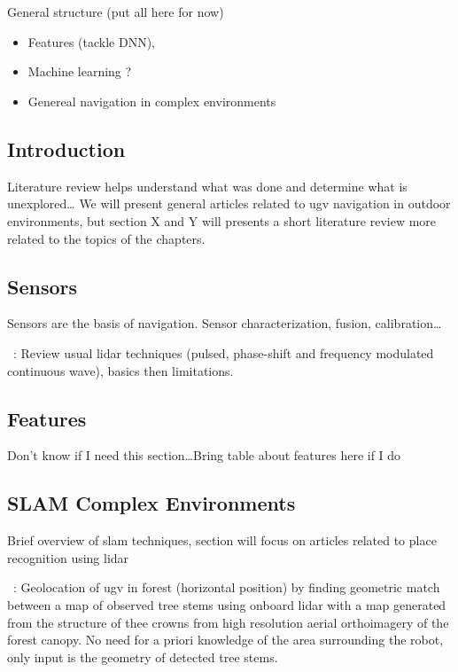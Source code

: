 \chapter{\chapzerotitle}
\label{chap:literature_review}

General structure (put all here for now)
\begin{itemize}
    \item Features (tackle DNN), 
    \item Machine learning ?
    \item Genereal navigation in complex environments
\end{itemize}

\section{Introduction}
Literature review helps understand what was done and determine what is unexplored\dots
We will present general articles related to ugv navigation in outdoor environments, but section X and Y will presents a short literature review more related to the topics of the chapters.


\section{Sensors}
Sensors are the basis of navigation. Sensor characterization, fusion, calibration\dots

~\cite{Bosch2001}:
Review usual lidar techniques (pulsed, phase-shift and frequency modulated continuous wave), basics then limitations.


\section{Features}
Don't know if I need this section\dots Bring table about features here if I do


\section{SLAM Complex Environments}
Brief overview of slam techniques, section will focus on articles related to place recognition using lidar

~\cite{Hussein2015}:
Geolocation of ugv in forest (horizontal position) by finding geometric match between a map of observed tree stems using onboard lidar with a map generated from the structure of thee crowns from high resolution aerial orthoimagery of the forest canopy. No need for a priori knowledge of the area surrounding the robot, only input is the geometry of detected tree stems.

